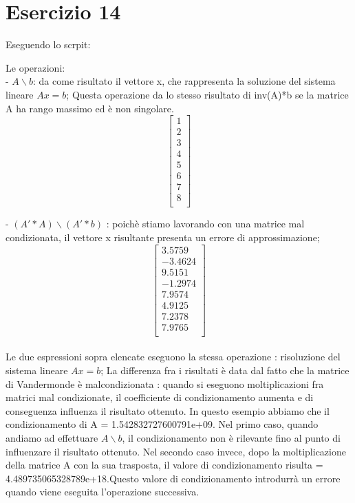 \section{Esercizio 14}

Eseguendo lo scrpit:


Le operazioni:\\
-  $A \backslash b$: da come risultato il vettore x, che rappresenta la soluzione del sistema lineare $Ax = b$; Questa operazione da lo stesso risultato di  inv(A)*b se la matrice A ha rango massimo ed è non singolare.
\[\begin{bmatrix}
1 \\
2 \\
3 \\
4 \\
5\\
6 \\
7 \\
8\\
\end{bmatrix}\]

- $(A'*A) \backslash(A'* b)$ : poichè stiamo lavorando con una matrice mal condizionata, il vettore x risultante presenta un errore di approssimazione;
\[\begin{bmatrix}
3.5759 \\
-3.4624 \\
9.5151 \\
-1.2974\\
7.9574\\
4.9125\\
7.2378 \\
7.9765\\
\end{bmatrix}\]
\\

Le due espressioni sopra elencate eseguono la stessa operazione : risoluzione del sistema lineare $Ax = b$; La differenza fra i risultati è data dal fatto che la matrice di Vandermonde è malcondizionata : quando si eseguono moltiplicazioni fra matrici mal condizionate, il coefficiente di condizionamento aumenta e di conseguenza influenza il risultato ottenuto.
In questo esempio abbiamo che il condizionamento di A = 1.542832727600791e+09. Nel primo caso, quando andiamo ad effettuare $A \backslash b$, il condizionamento non è rilevante fino al punto di influenzare il risultato ottenuto. Nel secondo caso invece, dopo la moltiplicazione della matrice A con la sua trasposta, il valore di condizionamento risulta = 4.489735065328789e+18.Questo valore di condizionamento introdurrà un errore quando viene eseguita l'operazione successiva.


